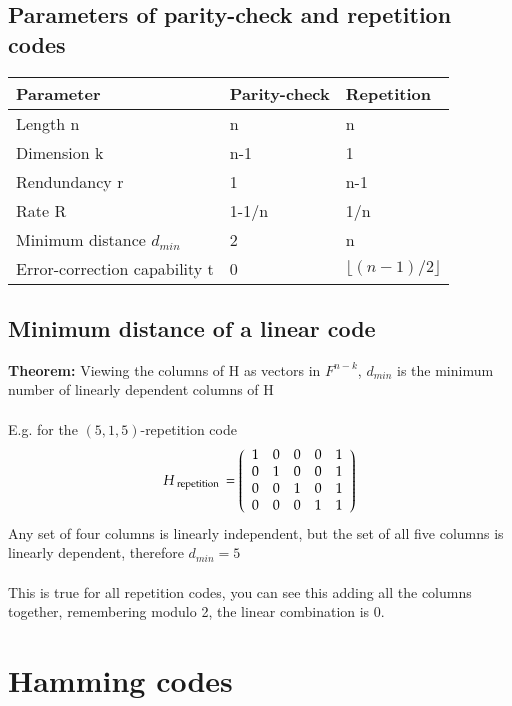 \documentclass{article}[18pt]
\begin{document}
\subsection{Parameters of parity-check and repetition codes}
\begin{tabularx}{\textwidth}{|X|X|X|}
	\hline 
	Parameter & Parity-check & Repetition \\ 
	\hline 
	Length n & n & n \\ 
	\hline 
	Dimension k & n-1 & 1 \\ 
	\hline 
	Rendundancy r & 1 & n-1 \\ 
	\hline 
	Rate R & 1-1/n & 1/n \\ 
	\hline 
	Minimum distance $d_{min}$ & 2 & n \\ 
	\hline 
	Error-correction capability t & 0 & $\lfloor (n-1)/2\rfloor$ \\ 
	\hline 
\end{tabularx} 
\subsection{Minimum distance of a linear code}
\textbf{Theorem:} Viewing the columns of H as vectors in $F^{n-k}$, $d_{min}$ is the minimum number of linearly dependent columns of H\\
\\
E.g. for the $(5,1,5)$-repetition code
$$H_ { \text { repetition } } = \left( \begin{array} { c c c c c } { 1 } & { 0 } & { 0 } & { 0 } & { 1 } \\ { 0 } & { 1 } & { 0 } & { 0 } & { 1 } \\ { 0 } & { 0 } & { 1 } & { 0 } & { 1 } \\ { 0 } & { 0 } & { 0 } & { 1 } & { 1 } \end{array} \right)$$
Any set of four columns is linearly independent, but the set of all five columns is linearly dependent, therefore $d_{min}=5$\\
\\
This is true for all repetition codes, you can see this adding all the columns together, remembering modulo 2, the linear combination is 0.
\section{Hamming codes}
\end{document}
